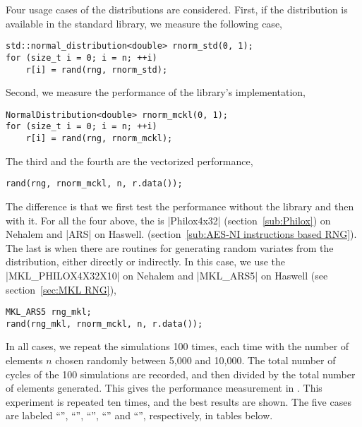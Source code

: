 Four usage cases of the distributions are considered. First, if the
distribution is available in the standard library, we measure the following
case,
\begin{verbatim}
std::normal_distribution<double> rnorm_std(0, 1);
for (size_t i = 0; i = n; ++i)
    r[i] = rand(rng, rnorm_std);
\end{verbatim}
Second, we measure the performance of the library's implementation,
\begin{verbatim}
NormalDistribution<double> rnorm_mckl(0, 1);
for (size_t i = 0; i = n; ++i)
    r[i] = rand(rng, rnorm_mckl);
\end{verbatim}
The third and the fourth are the vectorized performance,
\begin{verbatim}
rand(rng, rnorm_mckl, n, r.data());
\end{verbatim}
The difference is that we first test the performance without the \mkl \vml
library and then with it. For all the four above, the \rng is |Philox4x32|
(section~\ref{sub:Philox}) on Nehalem and |ARS| on Haswell.
(section~\ref{sub:AES-NI instructions based RNG}). The last is when there are
\mkl routines for generating random variates from the distribution, either
directly or indirectly. In this case, we use the \rng |MKL_PHILOX4X32X10| on
Nehalem and |MKL_ARS5| on Haswell (see section~\ref{sec:MKL RNG}),
\begin{verbatim}
MKL_ARS5 rng_mkl;
rand(rng_mkl, rnorm_mckl, n, r.data());
\end{verbatim}
In all cases, we repeat the simulations 100 times, each time with the number of
elements $n$ chosen randomly between 5,000 and 10,000. The total number of
cycles of the 100 simulations are recorded, and then divided by the total
number of elements generated. This gives the performance measurement in \cpe.
This experiment is repeated ten times, and the best results are shown. The five
cases are labeled ``\std'', ``\mckl'', ``\batch'', ``\vml'' and ``\mkl'',
respectively, in tables below.










